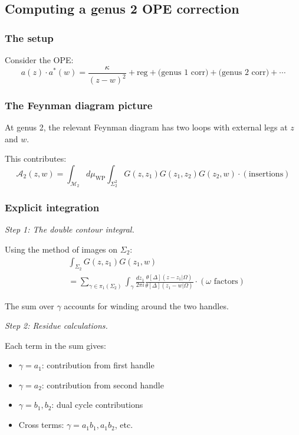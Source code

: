 \subsection{Computing a genus 2 OPE correction}

\subsubsection{The setup}

Consider the OPE:
\[a(z) \cdot a^*(w) = \frac{\kappa}{(z-w)^2} + \text{reg}
+ \text{(genus 1 corr)} + \text{(genus 2 corr)} + \cdots\]

\subsubsection{The Feynman diagram picture}

At genus 2, the relevant Feynman diagram has two loops with external legs at $z$ and $w$.

This contributes:
\[\mathcal{A}_2(z,w) = \int_{\mathcal{M}_2} d\mu_{\text{WP}}
\int_{\Sigma_2^2} G(z, z_1) G(z_1, z_2) G(z_2, w) \cdot (\text{insertions})\]

\subsubsection{Explicit integration}

\emph{Step 1: The double contour integral.}

Using the method of images on $\Sigma_2$:
\begin{align}
&\int_{\Sigma_2} G(z, z_1) G(z_1, w) \\
&= \sum_{\gamma \in \pi_1(\Sigma_2)}
\int_{\gamma} \frac{dz_1}{2\pi i}
\frac{\theta[\Delta](z - z_1 | \Omega)}{\theta[\Delta](z_1 - w | \Omega)}
\cdot (\omega \text{ factors})
\end{align}

The sum over $\gamma$ accounts for winding around the two handles.

\emph{Step 2: Residue calculations.}

Each term in the sum gives:
\begin{itemize}
\item $\gamma = a_1$: contribution from first handle
\item $\gamma = a_2$: contribution from second handle
\item $\gamma = b_1, b_2$: dual cycle contributions
\item Cross terms: $\gamma = a_1 b_1, a_1 b_2$, etc.
\end{itemize}

